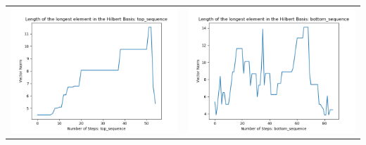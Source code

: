 \documentclass[10pt]{article}
\begin{document}
\begin{tabular}{c|c}
\begin{minipage}{.4\textwidth}
\includegraphics[width=\textwidth]{"DATA/4d/5 generators 2 bound H/top_sequence LENGTH"}
\end{minipage} &
\begin{minipage}{.4\textwidth}
\includegraphics[width=\textwidth]{"DATA/4d/5 generators 2 bound H bottomup/bottom_sequence LENGTH"}
\end{minipage}
\end{tabular}
\end{document}
